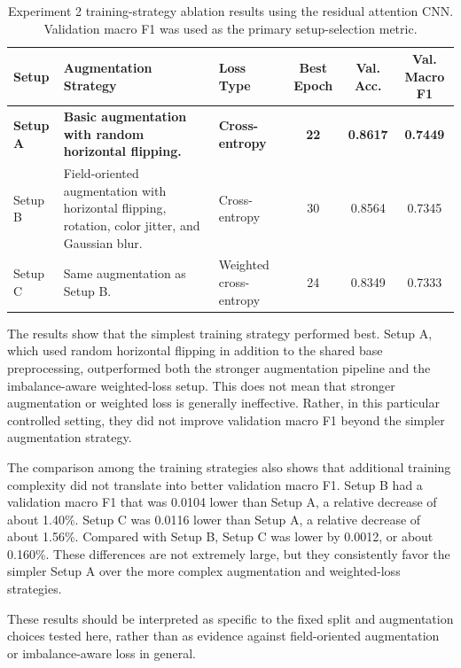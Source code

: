 \documentclass[11pt]{article}
\begin{document}
\begin{table}[htbp]
    \centering
    \small
    \caption{Experiment 2 training-strategy ablation results using the residual attention CNN. Validation macro F1 was used as the primary setup-selection metric.}
    \label{tab:exp2_results}
    \begin{tabularx}{\textwidth}{L{0.11\textwidth}>{\raggedright\arraybackslash}XL{0.17\textwidth}ccc}
        \toprule
        Setup & Augmentation Strategy & Loss Type & Best Epoch & Val. Acc. & Val. Macro F1 \\
        \midrule
        \textbf{Setup A} 
        & \textbf{Basic augmentation with random horizontal flipping.} 
        & \textbf{Cross-entropy} 
        & \textbf{22} & \textbf{0.8617} & \textbf{0.7449} \\
        \addlinespace
        Setup B 
        & Field-oriented augmentation with horizontal flipping, rotation, color jitter, and Gaussian blur. 
        & Cross-entropy 
        & 30 & 0.8564 & 0.7345 \\
        \addlinespace
        Setup C 
        & Same augmentation as Setup B. 
        & Weighted cross-entropy 
        & 24 & 0.8349 & 0.7333 \\
        \bottomrule
    \end{tabularx}
\end{table}

The results show that the simplest training strategy performed best. Setup A, which used random horizontal flipping in addition to the shared base preprocessing, outperformed both the stronger augmentation pipeline and the imbalance-aware weighted-loss setup. This does not mean that stronger augmentation or weighted loss is generally ineffective. Rather, in this particular controlled setting, they did not improve validation macro F1 beyond the simpler augmentation strategy.

The comparison among the training strategies also shows that additional training complexity did not translate into better validation macro F1. Setup B had a validation macro F1 that was 0.0104 lower than Setup A, a relative decrease of about 1.40\%. Setup C was 0.0116 lower than Setup A, a relative decrease of about 1.56\%. Compared with Setup B, Setup C was lower by 0.0012, or about 0.160\%. These differences are not extremely large, but they consistently favor the simpler Setup A over the more complex augmentation and weighted-loss strategies.

These results should be interpreted as specific to the fixed split and augmentation choices tested here, rather than as evidence against field-oriented augmentation or imbalance-aware loss in general.
\end{document}

